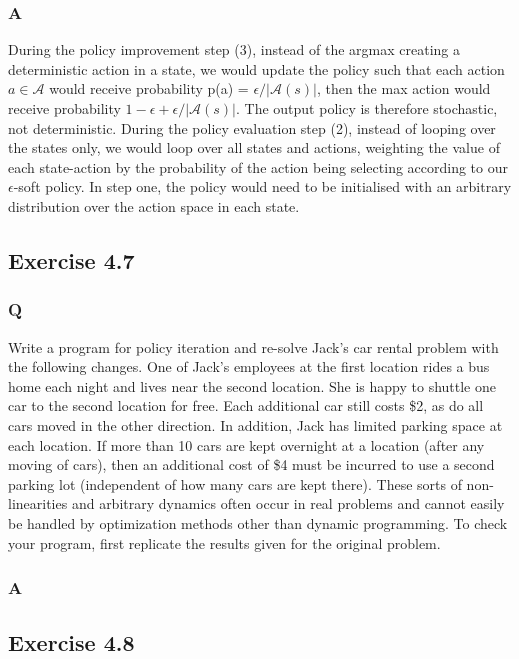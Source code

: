\subsubsection{A}
During the policy improvement step (3), instead of the argmax creating a deterministic action in a state, we would update the policy such that each action $a \in \mathcal{A}$ would receive probability p(a) = $\epsilon /|\mathcal{A}(s)|$, then the max action would receive probability $1 - \epsilon + \epsilon /|\mathcal{A}(s)|$. The output policy is therefore stochastic, not deterministic. During the policy evaluation step (2), instead of looping over the states only, we would loop over all states and actions, weighting the value of each state-action by the probability of the action being selecting according to our $\epsilon$-soft policy. In step one, the policy would need to be initialised with an arbitrary distribution over the action space in each state.

\subsection{Exercise 4.7}
\subsubsection{Q}
Write a program for policy iteration and re-solve Jack’s car rental problem with the following changes. One of Jack’s employees at the first location rides a bus home each night and lives near the second location. She is happy to shuttle one car to the second location for free. Each additional car still costs \$2, as do all cars moved in the other direction. In addition, Jack has limited parking space at each location. If more than 10 cars are kept overnight at a location (after any moving of cars), then an additional cost of \$4 must be incurred to use a second parking lot (independent of how many cars are kept there). These sorts of non-linearities and arbitrary dynamics often occur in real problems and cannot easily be handled by optimization methods other than dynamic programming. To check your program, first replicate the results given for the original problem.
\subsubsection{A}
\ProgrammingExercise

\subsection{Exercise 4.8}

